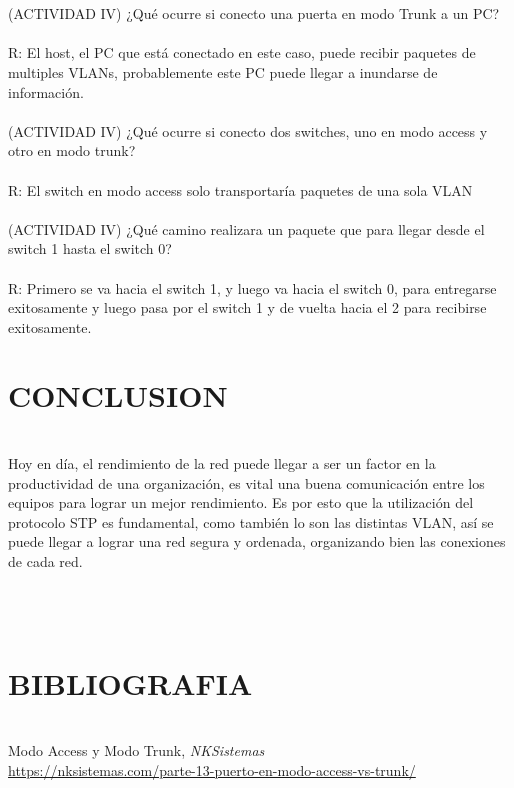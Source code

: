\documentclass[onecolumn,12pt]{IEEEtran}
\begin{document}
\\ \\
(ACTIVIDAD IV) ¿Qué ocurre si conecto una puerta en modo Trunk a un PC?\\ \\
R: El host, el PC que está conectado en este caso, puede recibir paquetes de multiples VLANs, probablemente este PC puede llegar a inundarse de información.
\\ \\
(ACTIVIDAD IV) ¿Qué ocurre si conecto dos switches, uno en modo access y otro en modo trunk?\\ \\
R: El switch en modo access solo transportaría paquetes de una sola VLAN
\\ \\
(ACTIVIDAD IV) ¿Qué camino realizara un paquete que para llegar desde el switch 1 hasta el switch 0?\\ \\
R: Primero se va hacia el switch 1, y luego va hacia el switch 0, para entregarse exitosamente y luego pasa por el switch 1 y de vuelta hacia el 2 para recibirse exitosamente.

\newpage
\section{CONCLUSION}
\hfill \\

Hoy en día, el rendimiento de la red puede llegar a ser un factor en la productividad de una organización, es vital una buena comunicación entre los equipos para lograr un mejor rendimiento. Es por esto que la utilización del protocolo STP es fundamental, como también lo son las distintas VLAN, así se puede llegar a lograr una red segura y ordenada, organizando bien las conexiones de cada red.



\hfill \\
\hfill \\
\section{BIBLIOGRAFIA}
\hfill \\
Modo Access y Modo Trunk,
\emph{NKSistemas} \\
\url{https://nksistemas.com/parte-13-puerto-en-modo-access-vs-trunk/}
\end{document}
